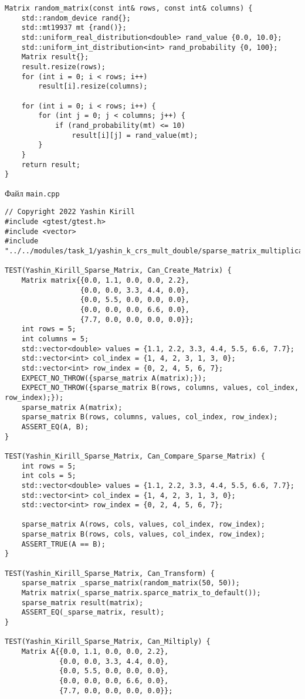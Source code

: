 \documentclass{report}
\begin{document}
\begin{lstlisting}
Matrix random_matrix(const int& rows, const int& columns) {
    std::random_device rand{};
    std::mt19937 mt {rand()};
    std::uniform_real_distribution<double> rand_value {0.0, 10.0};
    std::uniform_int_distribution<int> rand_probability {0, 100};
    Matrix result{};
    result.resize(rows);
    for (int i = 0; i < rows; i++)
        result[i].resize(columns);

    for (int i = 0; i < rows; i++) {
        for (int j = 0; j < columns; j++) {
            if (rand_probability(mt) <= 10)
                result[i][j] = rand_value(mt);
        }
    }
    return result;
}

\end{lstlisting}
Файл \verb|main.cpp|
\begin{lstlisting}
// Copyright 2022 Yashin Kirill
#include <gtest/gtest.h>
#include <vector>
#include "../../modules/task_1/yashin_k_crs_mult_double/sparse_matrix_multiplication_crs.h"

TEST(Yashin_Kirill_Sparse_Matrix, Can_Create_Matrix) {
    Matrix matrix{{0.0, 1.1, 0.0, 0.0, 2.2},
                  {0.0, 0.0, 3.3, 4.4, 0.0},
                  {0.0, 5.5, 0.0, 0.0, 0.0},
                  {0.0, 0.0, 0.0, 6.6, 0.0},
                  {7.7, 0.0, 0.0, 0.0, 0.0}};
    int rows = 5;
    int columns = 5;
    std::vector<double> values = {1.1, 2.2, 3.3, 4.4, 5.5, 6.6, 7.7};
    std::vector<int> col_index = {1, 4, 2, 3, 1, 3, 0};
    std::vector<int> row_index = {0, 2, 4, 5, 6, 7};
    EXPECT_NO_THROW({sparse_matrix A(matrix);});
    EXPECT_NO_THROW({sparse_matrix B(rows, columns, values, col_index, row_index);});
    sparse_matrix A(matrix);
    sparse_matrix B(rows, columns, values, col_index, row_index);
    ASSERT_EQ(A, B);
}

TEST(Yashin_Kirill_Sparse_Matrix, Can_Compare_Sparse_Matrix) {
    int rows = 5;
    int cols = 5;
    std::vector<double> values = {1.1, 2.2, 3.3, 4.4, 5.5, 6.6, 7.7};
    std::vector<int> col_index = {1, 4, 2, 3, 1, 3, 0};
    std::vector<int> row_index = {0, 2, 4, 5, 6, 7};

    sparse_matrix A(rows, cols, values, col_index, row_index);
    sparse_matrix B(rows, cols, values, col_index, row_index);
    ASSERT_TRUE(A == B);
}

TEST(Yashin_Kirill_Sparse_Matrix, Can_Transform) {
    sparse_matrix _sparse_matrix(random_matrix(50, 50));
    Matrix matrix(_sparse_matrix.sparce_matrix_to_default());
    sparse_matrix result(matrix);
    ASSERT_EQ(_sparse_matrix, result);
}

TEST(Yashin_Kirill_Sparse_Matrix, Can_Miltiply) {
    Matrix A{{0.0, 1.1, 0.0, 0.0, 2.2},
             {0.0, 0.0, 3.3, 4.4, 0.0},
             {0.0, 5.5, 0.0, 0.0, 0.0},
             {0.0, 0.0, 0.0, 6.6, 0.0},
             {7.7, 0.0, 0.0, 0.0, 0.0}};


\end{lstlisting}
\end{document}
